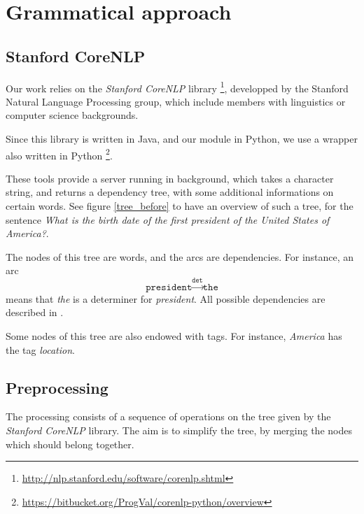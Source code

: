 \section{Grammatical approach}

\subsection{Stanford CoreNLP}

Our work relies on the \emph{Stanford CoreNLP} library
\footnote{\url{http://nlp.stanford.edu/software/corenlp.shtml}}, developped by
the Stanford Natural Language Processing group, which include members with 
linguistics or computer science backgrounds. 

Since this library is written in Java, and our module in Python, we use a wrapper
also written in Python
\footnote{\url{https://bitbucket.org/ProgVal/corenlp-python/overview}}.

These tools provide a server running in background, which takes a character string,
and returns a dependency tree, with some additional informations on certain words.
See figure \ref{tree_before} to have an overview of such a tree, for the sentence
\emph{What is the birth date of the first president of the United States of America?}.

The nodes of this tree are words, and the arcs are dependencies. For instance,
an arc $$\texttt{president}\xrightarrow{\texttt{det}}\texttt{the}$$ means that
\emph{the} is a determiner for \emph{president}. All possible dependencies are 
described in \cite{stanfordDep}. 

Some nodes of this tree are also endowed with tags. For instance, \emph{America}
has the tag \emph{location}.


\subsection{Preprocessing}

The processing consists of a sequence of operations on the tree given by the 
\emph{Stanford CoreNLP} library. The aim is to simplify the tree, by merging the
nodes which should belong together.

